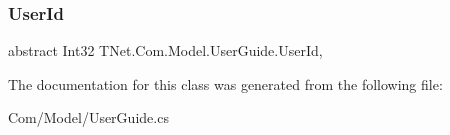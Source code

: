 \subsubsection{\texorpdfstring{User\+Id}{UserId}}
{\footnotesize\ttfamily abstract Int32 T\+Net.\+Com.\+Model.\+User\+Guide.\+User\+Id\hspace{0.3cm}{\ttfamily [get]}, {\ttfamily [set]}}







The documentation for this class was generated from the following file\+:\begin{DoxyCompactItemize}
\item 
Com/\+Model/User\+Guide.\+cs\end{DoxyCompactItemize}
